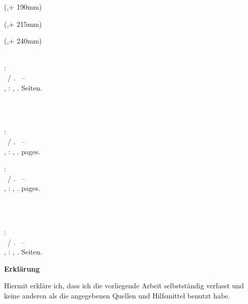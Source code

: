 \begin{textblock*}{\seitenbreite}(\bindekorrektur,\seitenanfang + 190mm)
  \centering\large 
  \textsf{\dhbwdatum}
\end{textblock*}

\begin{textblock*}{\seitenbreite}(\bindekorrektur,\seitenanfang + 215mm)
  \centering\large 
\end{textblock*}

\begin{textblock*}{\seitenbreite}(\bindekorrektur,\seitenanfang + 240mm)
  \centering\large\sffamily
  \dhbwtutor \\
  \vspace{2mm}
  \dhbwbetreuer\\
  \vspace{2mm}
  \dhbwzweitkorrektor
\end{textblock*}

\null\newpage
\thispagestyle{empty}
  
\newcommand{\dhbwbibde}{\begin{small}\textbf{\dhbwautorbib}: \\ \dhbwtitelde \ / \dhbwautor. \ -- \\ \dhbwtypde, \dhbwort : \dhbwkoerperschaftde, \dhbwjahr. \pageref{lastpage} Seiten.\end{small}}

\newcommand{\dhbwbiben}{\begin{small}\textbf{\dhbwautorbib}: \\ \dhbwtitelen \ / \dhbwautor. \ -- \\ \dhbwtypen, \dhbwort : \dhbwkoerperschaften, \dhbwjahr. \pageref{lastpage} pages. \end{small}}

%
  {\dhbwbibde \\ \vspace{0.5cm} \\ \dhbwbiben}
  {\dhbwbiben \\ \vspace{0.5cm} \\ \dhbwbibde}


\clearpage\setcounter{page}{1}
\thispagestyle{empty}
\textsf{\large\textbf{Erklärung}}

Hiermit erkläre ich, dass ich die vorliegende Arbeit selbstständig verfasst und keine anderen als die angegebenen Quellen und Hilfsmittel benutzt habe.

